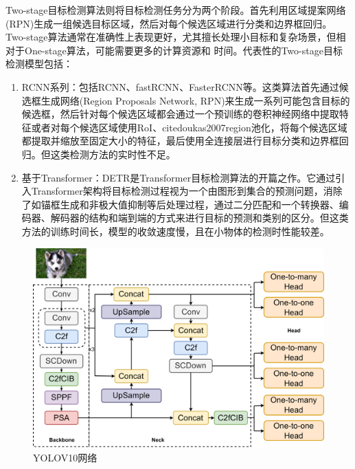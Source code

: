 Two-stage目标检测算法则将目标检测任务分为两个阶段。首先利用区域提案网络(RPN)生成一组候选目标区域，然后对每个候选区域进行分类和边界框回归。Two-stage算法通常在准确性上表现更好，尤其擅长处理小目标和复杂场景，但相对于One-stage算法，可能需要更多的计算资源和
时间。代表性的Two-stage目标检测模型包括：
\begin{enumerate}[topsep = 0 pt, itemsep= 0 pt, parsep=0pt, partopsep=0pt, leftmargin=44pt, itemindent=0pt, labelsep=6pt, label=(\arabic*)]
    \item 	RCNN系列：包括RCNN\cite{girshick2014rich}、fastRCNN\cite{girshick2015fast}、FasterRCNN\cite{ren2016faster}等。这类算法首先通过候选框生成网络(Region Proposals Network, RPN)来生成一系列可能包含目标的候选框，然后针对每个候选区域都会通过一个预训练的卷积神经网络中提取特征或者对每个候选区域使用RoI、cite{doukas2007region}池化，将每个候选区域都提取并缩放至固定大小的特征，最后使用全连接层进行目标分类和边界框回归。但这类检测方法的实时性不足。
    \item	基于Transformer：DETR\cite{carion2020end}是Transformer目标检测算法的开篇之作。它通过引入Transformer架构将目标检测过程视为一个由图形到集合的预测问题，消除了如锚框生成和非极大值抑制等后处理过程，通过二分匹配和一个转换器、编码器、解码器的结构和端到端的方式来进行目标的预测和类别的区分。但这类方法的训练时间长，模型的收敛速度慢，且在小物体的检测时性能较差。
\end{enumerate}

\begin{figure}[htbp]
    \centering
    \includegraphics[scale=0.12]{Fig/yolonet.png}
    \caption{\label{fyolonet}YOLOV10网络}
\end{figure}


